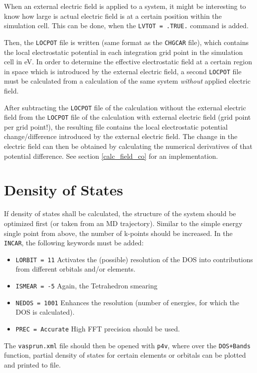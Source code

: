 \documentclass[a4paper,11pt]{article}
\begin{document}
When an external electric field is applied to a system, it might be interesting to know
how large is actual electric field is at a certain position within the simulation cell.
This can be done, when the \texttt{LVTOT = .TRUE.} command is added.

Then, the \texttt{LOCPOT} file is written (same format as the \texttt{CHGCAR} file), which
contains the local electrostatic potential in each integration grid point in the simulation
cell in eV.
In order to determine the effective electrostatic field at a certain region in space which
is introduced by the external electric field, a second \texttt{LOCPOT} file must
be calculated from a calculation of the same system \textit{without} applied electric field.

After subtracting the \texttt{LOCPOT} file of the calculation without the external electric
field from the \texttt{LOCPOT} file of the calculation with external electric field (grid point
per grid point!), the resulting file contains the local electrostatic potential change/difference introduced
by the external electric field. The change in the electric field can then be obtained by
calculating the numerical derivatives of that potential difference. See section \ref{calc_field_co} for an implementation.

\section{Density of States}

If density of states shall be calculated, the structure of the system should be optimized 
first (or taken from an MD trajectory).
Similar to the simple energy single point from above, the number of k-points should be 
increased.
In the \texttt{INCAR}, the following keywords must be added:

\begin{itemize}
 \item \texttt{LORBIT = 11} Activates the (possible) resolution of the DOS into 
 contributions from different orbitals and/or elements.
 \item \texttt{ISMEAR = -5} Again, the Tetrahedron smearing
 \item \texttt{NEDOS = 1001} Enhances the resolution (number of energies, for which the 
 DOS is calculated).
 \item \texttt{PREC = Accurate} High FFT precision should be used.
\end{itemize}

The \texttt{vasprun.xml} file should then be opened with \texttt{p4v}, where over
the \texttt{DOS+Bands} function, partial density of states for certain
elements or orbitals can be plotted and printed to file.
\end{document}
